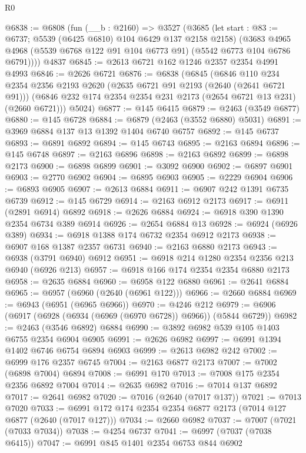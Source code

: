 \begin{lexlean}{R0}
\begin{coremodule}
@6838 := @6808
    (fun (__b : @2160) =>
    @3527
      (@3685
        (let start : @83 := @6737; @5539 (@6425 @6810) @104 @6429 @137 @2158 @2158)
        (@3683 @4965 @4968 (@5539 @6768 @122 @91 @104 @6773 @91) (@5542 @6773 @104 @6786 @6791))))
    @4837
@6845 := @2613 @6721 @162 @1246 @2357 @2354 @4991 @4993
@6846 := @2626 @6721
@6876 := @6838
    (@6845
      (@6846
        @110
        @234
        @2354
        @2356
        @2193
        @2620
        (@2635 @6721 @91 @2193 (@2640 (@2641 @6721 @91)))
        (@6846 @232 @174 @2354 @2354 @231 @2173 (@2654 @6721 @13 @231) (@2660 @6721)))
      @5024)
@6877 := @145 @6415
@6879 := @2463 (@3549 @6877)
@6880 := @145 @6728
@6884 := @6879 (@2463 (@3552 @6880) @5031)
@6891 := @3969 @6884 @137 @13 @1392 @1404 @6740 @6757
@6892 := @145 @6737
@6893 := @6891 @6892
@6894 := @145 @6743
@6895 := @2163 @6894
@6896 := @145 @6748
@6897 := @2163 @6896
@6898 := @2163 @6892
@6899 := @6898 @2173
@6900 := @6898 @6899
@6901 := @3092 @6900
@6902 := @6897 @6901
@6903 := @2770 @6902
@6904 := @6895 @6903
@6905 := @2229 @6904
@6906 := @6893 @6905
@6907 := @2613 @6884
@6911 := @6907 @242 @1391 @6735 @6739
@6912 := @145 @6729
@6914 := @2163 @6912 @2173
@6917 := @6911 (@2891 @6914) @6892
@6918 := @2626 @6884
@6924 := @6918 @390 @1390 @2354 @6734 @389 @6914
@6926 := @2654 @6884 @13
@6928 := @6924 (@6926 @389)
@6934 := @6918 @1388 @174 @6732 @2354 @6912 @2173
@6938 := @6907 @168 @1387 @2357 @6731
@6940 := @2163 @6880 @2173
@6943 := @6938 (@3791 @6940) @6912
@6951 := @6918 @214 @1280 @2354 @2356 @213 @6940 (@6926 @213)
@6957 := @6918 @166 @174 @2354 @2354 @6880 @2173
@6958 := @2635 @6884
@6960 := @6958 @122 @6880
@6961 := @2641 @6884
@6965 := @6957 (@6960 (@2640 (@6961 @122)))
@6966 := @2660 @6884
@6969 := @6943 (@6951 (@6965 @6966))
@6970 := @4246 @212
@6979 := @6906 (@6917 (@6928 (@6934 (@6969 (@6970 @6728)) @6966)) (@5844 @6729))
@6982 := @2463 (@3546 @6892) @6884
@6990 := @3892 @6982 @539 @105 @1403 @6755 @2354 @6904 @6905
@6991 := @2626 @6982
@6997 := @6991 @1394 @1402 @6746 @6754 @6894 @6903
@6999 := @2613 @6982 @242
@7002 := @6999 @176 @2357 @6745
@7004 := @2163 @6877 @2173
@7007 := @7002 (@6898 @7004) @6894
@7008 := @6991 @170
@7013 := @7008 @175 @2354 @2356 @6892 @7004
@7014 := @2635 @6982
@7016 := @7014 @137 @6892
@7017 := @2641 @6982
@7020 := @7016 (@2640 (@7017 @137))
@7021 := @7013 @7020
@7033 := @6991 @172 @174 @2354 @2354 @6877 @2173 (@7014 @127 @6877 (@2640 (@7017 @127)))
@7034 := @2660 @6982
@7037 := @7007 (@7021 (@7033 @7034))
@7038 := @4254 @6737
@7041 := @6997 (@7037 (@7038 @6415))
@7047 := @6991 @845 @1401 @2354 @6753 @844 @6902

\end{coremodule}
\end{lexlean}
